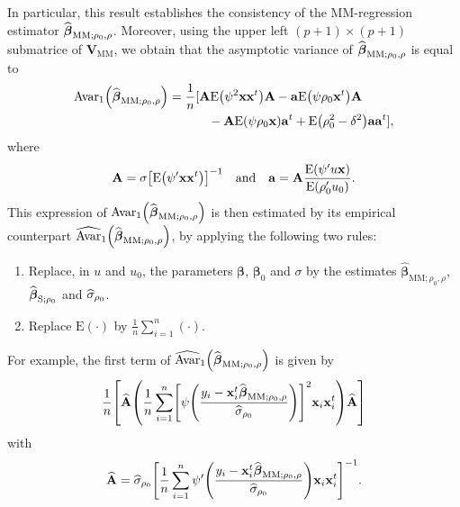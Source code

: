 In particular, this result establishes the consistency of the MM-regression
estimator $\widehat{\boldsymbol\beta}_{\mathrm{MM};\rho_{0},\rho}$.
Moreover, using the upper left $\left(  p+1\right)  \times(p+1)$ submatrice of
$\mathbf{V}_{\mathrm{MM}}$, we obtain that the asymptotic variance of
$\widehat{\boldsymbol\beta}_{\mathrm{MM};\rho_{0},\rho}$ is equal to
\begin{align*}
\mathrm{Avar}_{1}\left(  \sthat{\boldsymbol\beta}_{\mathrm{MM};\rho
_{0},\rho}\right)   &  =\frac{1}{n}[\mathbf{A}\mathrm{E}\left(  \psi
^{2}\mathbf{xx}^{t}\right)  \mathbf{A}-\mathbf{a}\mathrm{E}\left(  \psi
\rho_{0}\stvec{x}^{t}\right)  \mathbf{A}\\
&  \,\ \ \ \ \ \ \ \ \ -\mathbf{A}\mathrm{E}\left(  \psi\rho_{0}%
\stvec{x}\right)  \mathbf{a}^{t}+\mathrm{E}\left(  \rho_{0}^{2}-\delta
^{2}\right)  \mathbf{aa}^{t}],
\end{align*}
where
\[
\mathbf{A}=\sigma\left[  \mathrm{E}\left(  \psi^{\prime}\mathbf{xx}%
^{t}\right)  \right]  ^{-1}\quad\text{and\quad}\mathbf{a}=\mathbf{A}%
\frac{\mathrm{E}\left(  \psi^{\prime}u\stvec{x}\right)  }{\mathrm{E}\left(
\rho_{0}^{\prime}u_{0}\right)  }.
\]
This expression of $\mathrm{Avar}_{1}\left(  \sthat{\boldsymbol\beta%
}_{\mathrm{MM};\rho_{0},\rho}\right)  $ is then estimated by its empirical
counterpart $\sthat{\mathrm{Avar}}_{1}\left(  \sthat{\boldsymbol\beta%
}_{\mathrm{MM};\rho_{0},\rho}\right)  $, by applying the following two rules:

\begin{enumerate}
\item Replace, in $u$ and $u_{0}$, the parameters $\boldsymbol\beta$,
$\boldsymbol\beta_{0}$ and $\sigma$ by the estimates $\widehat
{\boldsymbol\beta}_{\mathrm{MM};\rho_{0},\rho}$, $\widehat{\boldsymbol{\beta
}}_{\mathrm{S};\rho_{0}}$ and $\widehat{\sigma}_{\rho_{0}}$.

\item Replace $\mathrm{E}\left(  \cdot\right)  $ by $\frac{1}{n}\sum_{i=1}%
^{n}\left(  \cdot\right)  $.
\end{enumerate}

For example, the first term of $\sthat{\mathrm{Avar}}_{1}\left(
\sthat{\boldsymbol\beta}_{\mathrm{MM};\rho_{0},\rho}\right)  $ is given
by
\[
\frac{1}{n}\left[  \sthat{\mathbf{A}}\left(  \frac{1}{n}\sum_{i=1}%
^{n}\left[  \psi\left(  \frac{y_{i}-\stvec{x}_{i}^{t}\widehat
{\boldsymbol\beta}_{\mathrm{MM};\rho_{0},\rho}}{\sthat{\sigma}_{\rho_{0}}%
}\right)  \right]  ^{2}\stvec{x}_{i}\stvec{x}_{i}^{t}\right)  \widehat
{\mathbf{A}}\right]
\]
with
\[
\sthat{\mathbf{A}}=\sthat{\sigma}_{\rho_{0}}\left[  \frac{1}{n}\sum
_{i=1}^{n}\psi^{\prime}\left(  \frac{y_{i}-\stvec{x}_{i}^{t}\widehat
{\boldsymbol\beta}_{\mathrm{MM};\rho_{0},\rho}}{\sthat{\sigma}_{\rho_{0}}%
}\right)  \stvec{x}_{i}\stvec{x}_{i}^{t}\right]  ^{-1}.
\]


